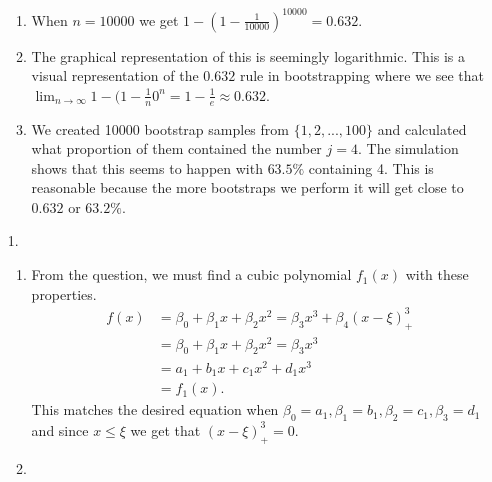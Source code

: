 \documentclass{article}
\begin{document}
\begin{enumerate}
\begin{enumerate}
        \item
        
        When $n=10000$ we get $1-(1-\frac{1}{10000})^{10000} = 0.632.$
        
        \item
        
        The graphical representation of this is seemingly logarithmic. This is a visual representation of the $0.632$ rule in bootstrapping where we see that $\lim_{n\to \infty}1-(1-\frac{1}{n}0^n = 1-\frac{1}{e} \approx 0.632$.
        
        \item
        
        We created 10000 bootstrap samples from $\{1, 2, ..., 100\}$ and calculated what proportion of them contained the number $j = 4$. The simulation shows that this seems to happen with $63.5\%$ containing 4. This is reasonable because the more bootstraps we perform it will get close to $0.632$ or $63.2\%.$
        
    \end{enumerate}
    
    \item [1. ]
    
    \begin{enumerate}
        \item 
        
        From the question, we must find a cubic polynomial $f_1(x)$ with these properties.
        \begin{align*}
            f(x) &= \beta_0 + \beta_1x + \beta_2x^2 = \beta_3x^3 + \beta_4(x-\xi)_+^3\\
            &= \beta_0 + \beta_1x + \beta_2x^2 = \beta_3x^3\\
            &= a_1 + b_1x+c_1x^2+d_1x^3\\
            &= f_1(x).
        \end{align*} This matches the desired equation when $\beta_0 = a_1, \beta_1 = b_1, \beta_2 = c_1, \beta_3 = d_1$ and since $x\leq \xi$ we get that $(x-\xi)^3_+ = 0$.
        
        \item
        

\end{enumerate}
\end{enumerate}
\end{document}
